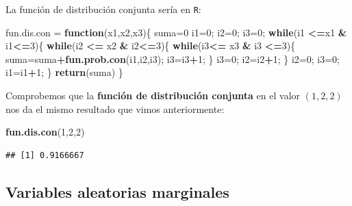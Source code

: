 \documentclass[]{book}
\newenvironment{Shaded}{\begin{snugshade}}{\end{snugshade}}
\newcommand{\ControlFlowTok}[1]{\textcolor[rgb]{0.13,0.29,0.53}{\textbf{#1}}}
\newcommand{\DecValTok}[1]{\textcolor[rgb]{0.00,0.00,0.81}{#1}}
\newcommand{\KeywordTok}[1]{\textcolor[rgb]{0.13,0.29,0.53}{\textbf{#1}}}
\newcommand{\NormalTok}[1]{#1}
\newcommand{\OperatorTok}[1]{\textcolor[rgb]{0.81,0.36,0.00}{\textbf{#1}}}
\newcommand{\StringTok}[1]{\textcolor[rgb]{0.31,0.60,0.02}{#1}}
\begin{document}
La función de distribución conjunta sería en \texttt{R}:

\begin{Shaded}
\begin{Highlighting}[]
\NormalTok{fun.dis.con =}\StringTok{ }\ControlFlowTok{function}\NormalTok{(x1,x2,x3)\{}
\NormalTok{  suma=}\DecValTok{0}
\NormalTok{  i1=}\DecValTok{0}\NormalTok{; i2=}\DecValTok{0}\NormalTok{; i3=}\DecValTok{0}\NormalTok{;}
  \ControlFlowTok{while}\NormalTok{(i1 }\OperatorTok{<=}\NormalTok{x1 }\OperatorTok{&}\StringTok{ }\NormalTok{i1}\OperatorTok{<=}\DecValTok{3}\NormalTok{)\{}
    \ControlFlowTok{while}\NormalTok{(i2 }\OperatorTok{<=}\StringTok{ }\NormalTok{x2 }\OperatorTok{&}\StringTok{ }\NormalTok{i2}\OperatorTok{<=}\DecValTok{3}\NormalTok{)\{}
      \ControlFlowTok{while}\NormalTok{(i3}\OperatorTok{<=}\StringTok{ }\NormalTok{x3 }\OperatorTok{&}\StringTok{ }\NormalTok{i3 }\OperatorTok{<=}\DecValTok{3}\NormalTok{)\{}
\NormalTok{        suma=suma}\OperatorTok{+}\KeywordTok{fun.prob.con}\NormalTok{(i1,i2,i3); i3=i3}\OperatorTok{+}\DecValTok{1}\NormalTok{;}
\NormalTok{      \}}
\NormalTok{      i3=}\DecValTok{0}\NormalTok{; i2=i2}\OperatorTok{+}\DecValTok{1}\NormalTok{;}
\NormalTok{    \}}
\NormalTok{    i2=}\DecValTok{0}\NormalTok{; i3=}\DecValTok{0}\NormalTok{; i1=i1}\OperatorTok{+}\DecValTok{1}\NormalTok{;}
\NormalTok{  \}}
  \KeywordTok{return}\NormalTok{(suma)}
\NormalTok{\}}
\end{Highlighting}
\end{Shaded}

Comprobemos que la \textbf{función de distribución conjunta} en el valor \((1,2,2)\) nos da el mismo resultado que vimos anteriormente:

\begin{Shaded}
\begin{Highlighting}[]
\KeywordTok{fun.dis.con}\NormalTok{(}\DecValTok{1}\NormalTok{,}\DecValTok{2}\NormalTok{,}\DecValTok{2}\NormalTok{)}
\end{Highlighting}
\end{Shaded}

\begin{verbatim}
## [1] 0.9166667
\end{verbatim}

\hypertarget{variables-aleatorias-marginales}{%
\subsection{Variables aleatorias marginales}\label{variables-aleatorias-marginales}}
\end{document}
